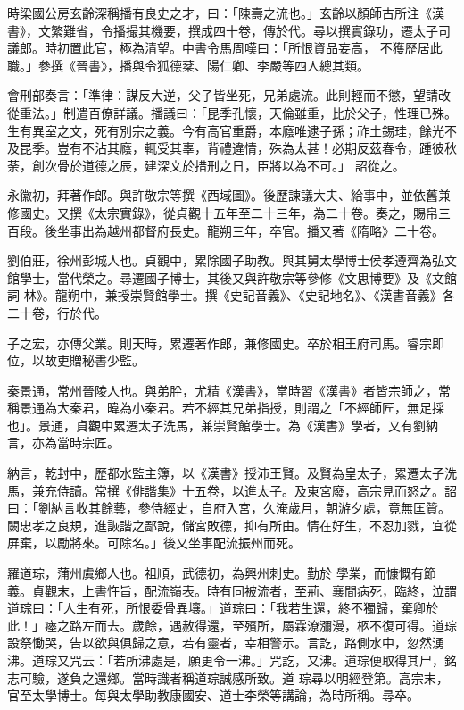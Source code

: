 \begin{pinyinscope}
 時梁國公房玄齡深稱播有良史之才，曰：「陳壽之流也。」玄齡以顏師古所注《漢書》，文繁難省，令播撮其機要，撰成四十卷，傳於代。尋以撰實錄功，遷太子司議郎。時初置此官，極為清望。中書令馬周嘆曰：「所恨資品妄高，
 不獲歷居此職。」參撰《晉書》，播與令狐德棻、陽仁卿、李嚴等四人總其類。



 會刑部奏言：「準律：謀反大逆，父子皆坐死，兄弟處流。此則輕而不懲，望請改從重法。」制遣百僚詳議。播議曰：「昆季孔懷，天倫雖重，比於父子，性理已殊。生有異室之文，死有別宗之義。今有高官重爵，本廕唯逮子孫；祚土錫珪，餘光不及昆季。豈有不沾其廕，輒受其辜，背禮違情，殊為太甚！必期反茲春令，踵彼秋荼，創次骨於道德之辰，建深文於措刑之日，臣將以為不可。」
 詔從之。



 永徽初，拜著作郎。與許敬宗等撰《西域圖》。後歷諫議大夫、給事中，並依舊兼修國史。又撰《太宗實錄》，從貞觀十五年至二十三年，為二十卷。奏之，賜帛三百段。後坐事出為越州都督府長史。龍朔三年，卒官。播又著《隋略》二十卷。



 劉伯莊，徐州彭城人也。貞觀中，累除國子助教。與其舅太學博士侯孝遵齊為弘文館學士，當代榮之。尋遷國子博士，其後又與許敬宗等參修《文思博要》及《文館詞
 林》。龍朔中，兼授崇賢館學士。撰《史記音義》、《史記地名》、《漢書音義》各二十卷，行於代。



 子之宏，亦傳父業。則天時，累遷著作郎，兼修國史。卒於相王府司馬。睿宗即位，以故吏贈秘書少監。



 秦景通，常州晉陵人也。與弟肸，尤精《漢書》，當時習《漢書》者皆宗師之，常稱景通為大秦君，暐為小秦君。若不經其兄弟指授，則謂之「不經師匠，無足採也」。景通，貞觀中累遷太子洗馬，兼崇賢館學士。為《漢書》學者，又有劉納
 言，亦為當時宗匠。



 納言，乾封中，歷都水監主簿，以《漢書》授沛王賢。及賢為皇太子，累遷太子洗馬，兼充侍讀。常撰《俳諧集》十五卷，以進太子。及東宮廢，高宗見而怒之。詔曰：「劉納言收其餘藝，參侍經史，自府入宮，久淹歲月，朝游夕處，竟無匡贊。闕忠孝之良規，進詼諧之鄙說，儲宮敗德，抑有所由。情在好生，不忍加戮，宜從屏棄，以勵將來。可除名。」後又坐事配流振州而死。



 羅道琮，蒲州虞鄉人也。祖順，武德初，為興州刺史。勤於
 學業，而慷慨有節義。貞觀末，上書忤旨，配流嶺表。時有同被流者，至荊、襄間病死，臨終，泣謂道琮曰：「人生有死，所恨委骨異壤。」道琮曰：「我若生還，終不獨歸，棄卿於此！」瘞之路左而去。歲餘，遇赦得還，至殯所，屬霖潦瀰漫，柩不復可得。道琮設祭慟哭，告以欲與俱歸之意，若有靈者，幸相警示。言訖，路側水中，忽然湧沸。道琮又咒云：「若所沸處是，願更令一沸。」咒訖，又沸。道琮便取得其尸，銘志可驗，遂負之還鄉。當時識者稱道琮誠感所致。道
 琮尋以明經登第。高宗末，官至太學博士。每與太學助教康國安、道士李榮等講論，為時所稱。尋卒。



\end{pinyinscope}